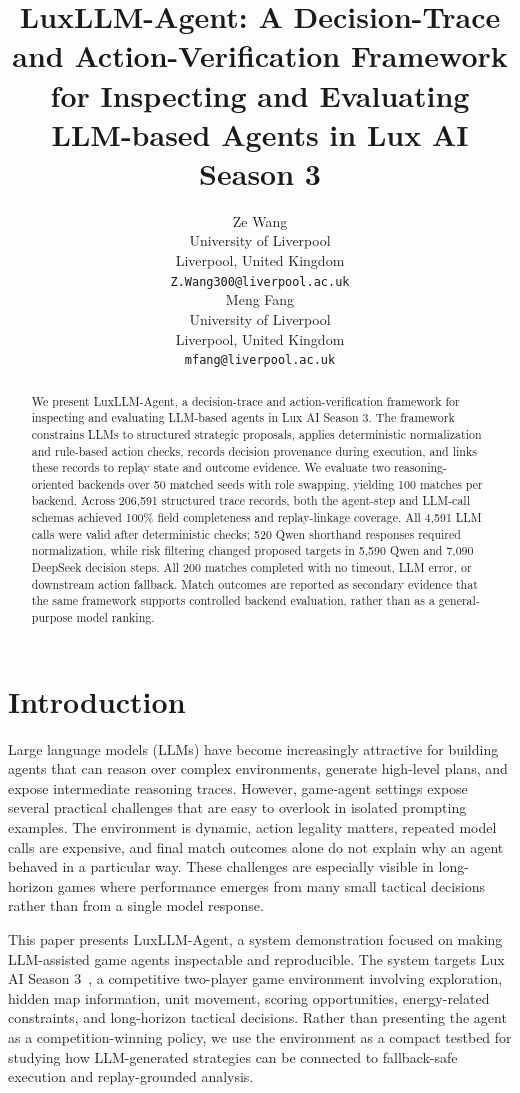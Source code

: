 \documentclass[11pt]{article}
\title{LuxLLM-Agent: A Decision-Trace and Action-Verification Framework for Inspecting and Evaluating LLM-based Agents in Lux AI Season 3}
\author{
  Ze Wang \\
  University of Liverpool \\
  Liverpool, United Kingdom \\
  \texttt{Z.Wang300@liverpool.ac.uk} \\
  \And
  Meng Fang \\
  University of Liverpool \\
  Liverpool, United Kingdom \\
  \texttt{mfang@liverpool.ac.uk}
}
\begin{document}
\maketitle

\begin{abstract}
We present LuxLLM-Agent, a decision-trace and action-verification framework for inspecting and evaluating LLM-based agents in Lux AI Season 3. The framework constrains LLMs to structured strategic proposals, applies deterministic normalization and rule-based action checks, records decision provenance during execution, and links these records to replay state and outcome evidence. We evaluate two reasoning-oriented backends over 50 matched seeds with role swapping, yielding 100 matches per backend. Across 206,591 structured trace records, both the agent-step and LLM-call schemas achieved 100\% field completeness and replay-linkage coverage. All 4,591 LLM calls were valid after deterministic checks; 520 Qwen shorthand responses required normalization, while risk filtering changed proposed targets in 5,590 Qwen and 7,090 DeepSeek decision steps. All 200 matches completed with no timeout, LLM error, or downstream action fallback. Match outcomes are reported as secondary evidence that the same framework supports controlled backend evaluation, rather than as a general-purpose model ranking.
\end{abstract}

\section{Introduction}

Large language models (LLMs) have become increasingly attractive for building agents that can reason over complex environments, generate high-level plans, and expose intermediate reasoning traces. However, game-agent settings expose several practical challenges that are easy to overlook in isolated prompting examples. The environment is dynamic, action legality matters, repeated model calls are expensive, and final match outcomes alone do not explain why an agent behaved in a particular way. These challenges are especially visible in long-horizon games where performance emerges from many small tactical decisions rather than from a single model response.

This paper presents LuxLLM-Agent, a system demonstration focused on making LLM-assisted game agents inspectable and reproducible. The system targets Lux AI Season 3~\citep{luxai2024}, a competitive two-player game environment involving exploration, hidden map information, unit movement, scoring opportunities, energy-related constraints, and long-horizon tactical decisions. Rather than presenting the agent as a competition-winning policy, we use the environment as a compact testbed for studying how LLM-generated strategies can be connected to fallback-safe execution and replay-grounded analysis.
\end{document}
